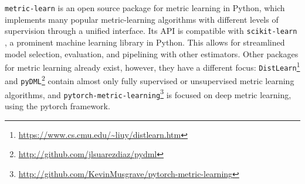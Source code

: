 \documentclass[twoside,11pt]{article}
\newcommand{\aurelien}[1]{\todo[inline,caption={},color=orange!40]{{\it Aurelien:~}#1}}
\begin{document}
\texttt{metric-learn} is an open source package for metric learning in Python, which implements many popular metric-learning algorithms with different levels of supervision through a unified interface.
Its API is compatible with \texttt{scikit-learn} \citep{scikit-learn}, a prominent machine learning library in Python. This allows for streamlined model selection, evaluation, and pipelining with other estimators.
Other packages for metric learning already exist, however, they have a different focus: \texttt{DistLearn}\footnote{\url{https://www.cs.cmu.edu/~liuy/distlearn.htm}} and \texttt{pyDML}\footnote{\url{http://github.com/jlsuarezdiaz/pydml}} contain almost only fully supervised or unsupervised metric learning algorithms, and \texttt{pytorch-metric-learning}\footnote{\url{http://github.com/KevinMusgrave/pytorch-metric-learning}} is focused on deep metric learning, using the pytorch framework.


\end{document}

